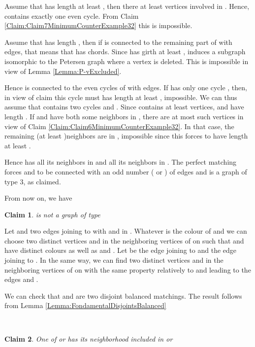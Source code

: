 \documentclass{elsart}
\theoremstyle{plain} \theoremheaderfont{\scshape}
\newtheorem{Clm}{Claim}[Thm]
\newenvironment{Prf}{{\bf \noindent Proof } }{\hfill\\}
\newenvironment{PrfClaim}{{\bf Proof }}{{\hfill\tiny{\\}}}
\begin{document}
\begin{Prf}
\begin{PrfClaim}
Assume that  has length at least , then there at least 
vertices involved in . Hence,  contains
exactly one even cycle. From Claim
\ref{Claim:Claim7MinimumCounterExample32} this is  impossible.

Assume that  has length  , then if  is connected to the
remaining part of  with  edges, that means that  has 
chords. Since  has girth at least ,  induces a subgraph
isomorphic to the Petersen graph where a vertex is deleted. This is
impossible in view of Lemma \ref{Lemma:P-vExcluded}.

Hence  is connected to the even cycles of  with 
edges. If  has only one cycle , then, in view of
claim this cycle must has length at least , impossible. We can
thus assume that  contains two cycles  and .
Since  contains at least  vertices,  and
 have length . If  and  have both some neighbors
in , there are at most  such vertices in view of Claim
\ref{Claim:Claim6MinimumCounterExample32}. In that case, the
remaining (at least )neighbors are in , impossible since
this forces  to have length at least .

Hence  has all its neighbors in  and  all its
neighbors in . The perfect matching  forces  and 
to be connected with an odd number ( or ) of edges and  is
a graph of type 3, as claimed.
\end{PrfClaim}





From now on, we have  

\begin{Clm} \label{Claim:Claim9MinimumCounterExample32}
 is not a graph of type 
\end{Clm}
\begin{PrfClaim}

Let  and  two edges joining  to  with  and
 in . Whatever is the colour of  and  we can choose
two distinct vertices  and  in the neighboring vertices of
 on  such that  and  have distinct colours as well
as  and . Let  be the edge joining  to  and  the
edge joining  to . In the same way, we can find two distinct
vertices  and  in the neighboring vertices of  on 
with the same property relatively to  and  leading to the
edges  and .

We can check that  and  are two
disjoint balanced matchings. The result follows from Lemma
\ref{Lemma:FondamentalDisjointsBalanced}

\end{PrfClaim}

\begin{Clm} \label{Claim:Claim10MinimumCounterExample32}
One of  or  has its neighborhood included in  or


\end{Clm}
\end{Prf}
\end{document}
